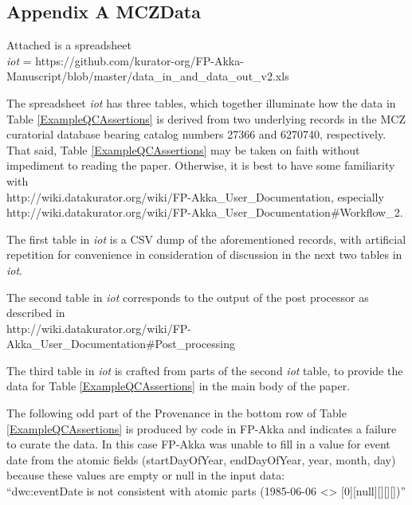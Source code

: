 \begin{appendices}
\large
\section{Appendix A MCZData} \label{appendix1}
\normalsize
Attached is a spreadsheet
\\\textit{iot} = https://github.com/kurator-org/FP-Akka-Manuscript/blob/master/data\_in\_and\_data\_out\_v2.xls 


The spreadsheet \textit{iot} has three tables, which together illuminate how the data 
in Table \ref{ExampleQCAssertions} is derived from two underlying records in the MCZ curatorial database bearing catalog numbers 27366 and 6270740, respectively. That said, Table \ref{ExampleQCAssertions} may be taken on faith without impediment to reading the paper. Otherwise, it is best to have some familiarity with 
\\http://wiki.datakurator.org/wiki/FP-Akka\_User\_Documentation, especially 
\\http://wiki.datakurator.org/wiki/FP-Akka\_User\_Documentation\#Workflow\_2.

The first table in \textit{iot} is a CSV dump of the aforementioned records, with artificial repetition for convenience in consideration of discussion in the next two tables in \textit{iot}.

The second table in \textit{iot} corresponds to the output of the post processor as described in
\\http://wiki.datakurator.org/wiki/FP-Akka\_User\_Documentation\#Post\_processing

The third table in \textit{iot} is crafted from parts of the second  \textit{iot} table, 
to provide the data for Table 
\ref{ExampleQCAssertions} in the main body of the paper.

The following odd part of the Provenance in the bottom row of Table \ref{ExampleQCAssertions}  is produced by code in FP-Akka and indicates a failure to curate the data. In this case FP-Akka was unable to fill in a value for event date from the atomic fields (startDayOfYear, endDayOfYear, year, month, day) because these values are empty or null in the input data:\\
\hspace{1in}``dwc:eventDate is not consistent with atomic parts (1985-06-06 <> [0][null][][][])''


\end{appendices}
